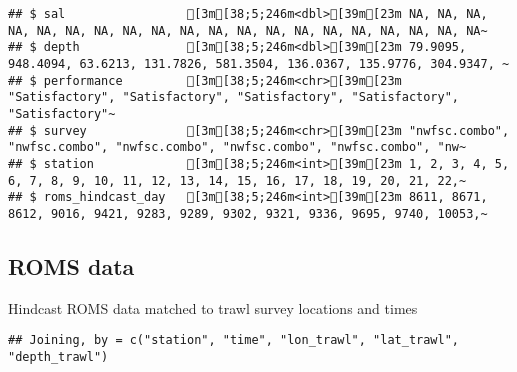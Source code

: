\documentclass[
]{article}
\newenvironment{Shaded}{\begin{snugshade}}{\end{snugshade}}
\newcommand{\CommentTok}[1]{\textcolor[rgb]{0.56,0.35,0.01}{\textit{#1}}}
\newcommand{\DataTypeTok}[1]{\textcolor[rgb]{0.13,0.29,0.53}{#1}}
\newcommand{\DecValTok}[1]{\textcolor[rgb]{0.00,0.00,0.81}{#1}}
\newcommand{\KeywordTok}[1]{\textcolor[rgb]{0.13,0.29,0.53}{\textbf{#1}}}
\newcommand{\NormalTok}[1]{#1}
\newcommand{\OperatorTok}[1]{\textcolor[rgb]{0.81,0.36,0.00}{\textbf{#1}}}
\newcommand{\StringTok}[1]{\textcolor[rgb]{0.31,0.60,0.02}{#1}}
\begin{document}
\begin{verbatim}
## $ sal                 [3m[38;5;246m<dbl>[39m[23m NA, NA, NA, NA, NA, NA, NA, NA, NA, NA, NA, NA, NA, NA, NA, NA, NA, NA, NA, NA~
## $ depth               [3m[38;5;246m<dbl>[39m[23m 79.9095, 948.4094, 63.6213, 131.7826, 581.3504, 136.0367, 135.9776, 304.9347, ~
## $ performance         [3m[38;5;246m<chr>[39m[23m "Satisfactory", "Satisfactory", "Satisfactory", "Satisfactory", "Satisfactory"~
## $ survey              [3m[38;5;246m<chr>[39m[23m "nwfsc.combo", "nwfsc.combo", "nwfsc.combo", "nwfsc.combo", "nwfsc.combo", "nw~
## $ station             [3m[38;5;246m<int>[39m[23m 1, 2, 3, 4, 5, 6, 7, 8, 9, 10, 11, 12, 13, 14, 15, 16, 17, 18, 19, 20, 21, 22,~
## $ roms_hindcast_day   [3m[38;5;246m<int>[39m[23m 8611, 8671, 8612, 9016, 9421, 9283, 9289, 9302, 9321, 9336, 9695, 9740, 10053,~
\end{verbatim}

\hypertarget{roms-data}{%
\subsection{ROMS data}\label{roms-data}}

Hindcast ROMS data matched to trawl survey locations and times

\begin{Shaded}
\end{Shaded}

\begin{verbatim}
## Joining, by = c("station", "time", "lon_trawl", "lat_trawl", "depth_trawl")
\end{verbatim}
\end{document}
